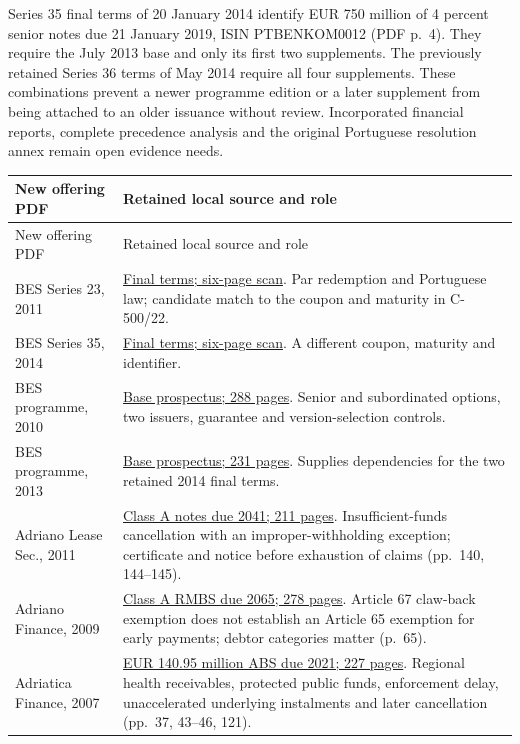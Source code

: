 \documentclass[12pt,a4paper,oneside,openany]{book}
\begin{document}
Series 35 final terms of 20 January 2014 identify EUR 750 million of
4 percent senior notes due 21 January 2019, ISIN PTBENKOM0012
(PDF p.~4). They require the July 2013 base and only its first two
supplements. The previously retained Series 36 terms of May 2014 require
all four supplements. These combinations prevent a newer programme edition
or a later supplement from being attached to an older issuance without
review. Incorporated financial reports, complete precedence analysis and
the original Portuguese resolution annex remain open evidence needs.

\begin{longtable}{P{0.29\textwidth}P{0.59\textwidth}}
\toprule
New offering PDF & Retained local source and role \\
\midrule
\endfirsthead
\toprule New offering PDF & Retained local source and role \\
\midrule
\endhead
BES Series 23, 2011 &
\href{../prospectus/corner-cases-2026-10-04/sources/jur-more-bes-1315263/source.pdf}
{Final terms; six-page scan}. Par redemption and Portuguese law; candidate
match to the coupon and maturity in C-500/22. \\
BES Series 35, 2014 &
\href{../prospectus/corner-cases-2026-10-04/sources/jur-more-bes-1922255/source.pdf}
{Final terms; six-page scan}. A different coupon, maturity and identifier. \\
BES programme, 2010 &
\href{../prospectus/corner-cases-2026-10-04/sources/jur-more-bes-1217215/source.pdf}
{Base prospectus; 288 pages}. Senior and subordinated options, two issuers,
guarantee and version-selection controls. \\
BES programme, 2013 &
\href{../prospectus/corner-cases-2026-10-04/sources/jur-more-bes-1774077/source.pdf}
{Base prospectus; 231 pages}. Supplies dependencies for the two retained
2014 final terms. \\
Adriano Lease Sec., 2011 &
\href{../prospectus/corner-cases-2026-10-04/sources/jur-more-hypo-1314069/source.pdf}
{Class A notes due 2041; 211 pages}. Insufficient-funds cancellation with
an improper-withholding exception; certificate and notice before exhaustion
of claims (pp.~140, 144--145). \\
Adriano Finance, 2009 &
\href{../prospectus/corner-cases-2026-10-04/sources/jur-more-hypo-1123807/source.pdf}
{Class A RMBS due 2065; 278 pages}. Article 67 claw-back exemption does not
establish an Article 65 exemption for early payments; debtor categories
matter (p.~65). \\
Adriatica Finance, 2007 &
\href{../prospectus/corner-cases-2026-10-04/sources/jur-more-hypo-843665/source.pdf}
{EUR 140.95 million ABS due 2021; 227 pages}. Regional health receivables,
protected public funds, enforcement delay, unaccelerated underlying
instalments and later cancellation (pp.~37, 43--46, 121). \\
\bottomrule
\end{longtable}
\end{document}
